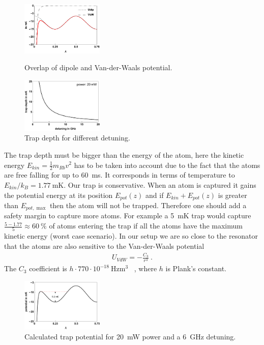 \begin{figure}
    \includegraphics[width=0.35\textwidth]{potentialoverlap}    
    \caption{\label{fig:potentialoverlap} Overlap of dipole and Van-der-Waals 
    potential.}
    \vspace{2em}
    \includegraphics[width=0.35\textwidth]{detuningopt}    
    \caption{\label{fig:detuningopt} Trap depth for different detuning.}
\end{figure}

The trap depth must be bigger than the energy of the atom, here the kinetic energy 
\(E_{kin} = \frac{1}{2}m_{Rb} v^2 \) has to be taken into account due to the fact 
that the atoms are free falling for up to \SI{60}{\milli\second}. It corresponds 
in terms of temperature to \(E_{kin}/k_B = \SI{1.77}{\milli\kelvin} \). Our trap 
is conservative. When an atom is captured it gains the potential energy at its
position \(E_{pot}(z) \) and if \(E_{kin} + E_{pot}(z) \) is greater than \(E_{pot,\max}\) 
then the atom will not be trapped. Therefore one should add a safety margin to 
capture more atoms. For example a \SI{5}{\milli\kelvin} trap would capture 
\(\frac{5-1.77}{5} \approx \SI{60}{\percent} \) of atoms entering the trap if all
the atoms have the maximum kinetic energy (worst case scenario). In our setup we 
are so close to the resonator that the atoms are also sensitive to the Van-der-Waals 
potential\cite{PhysRevA.89.022511}
\begin{align}
    U_{VdW} = -\frac{C_3}{r^3}~.
\end{align} 
The \(C_3\) coefficient is \( h\cdot770\cdot10^{-18}~\si{\hertz\meter\cubed}\)
~\cite{OsheaPHD}, where \(h\) is Plank's constant.

\begin{figure}
    \includegraphics[width=0.35\textwidth]{trapdepth}    
    \caption{\label{fig:trapdepth} Calculated trap potential for \SI{20}{\milli\watt}
     power and a \SI{6}{\giga\hertz} detuning.}
\end{figure}

